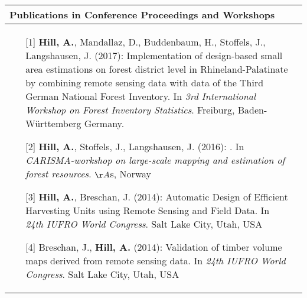 
\noindent
\begin{tabular*}{\textwidth}{p{}p{}}
	\multicolumn{2}{l}{\large Publications in Conference Proceedings and Workshops}\\
	\toprule
	
	\begin{enumerate}[]	
		
		\item [{[1]}] \textbf{Hill, A.}, Mandallaz, D., Buddenbaum, H., Stoffels, J., Langshausen, J. (2017): Implementation of design-based small area estimations on forest district level in Rhineland-Palatinate by combining remote sensing data with data of the Third German National Forest Inventory. In \textit{3rd International Workshop on Forest Inventory Statistics}. Freiburg, Baden-W{\"u}rttemberg Germany.
		
		\item [{[2]}] \textbf{Hill, A.}, Stoffels, J., Langshausen, J. (2016): . In \textit{CARISMA-workshop on large-scale mapping and estimation of forest resources}. $\AA$s, Norway
		
		\item [{[3]}] \textbf{Hill, A.}, Breschan, J. (2014): Automatic Design of Efficient Harvesting Units using Remote Sensing and Field Data. In \textit{24th IUFRO World Congress}. Salt Lake City, Utah, USA
		
		\item [{[4]}] Breschan, J., \textbf{Hill, A.} (2014): Validation of timber volume maps derived from remote sensing data. In \textit{24th IUFRO World Congress}. Salt Lake City, Utah, USA
		
	\end{enumerate}	
&\\
\end{tabular*}


